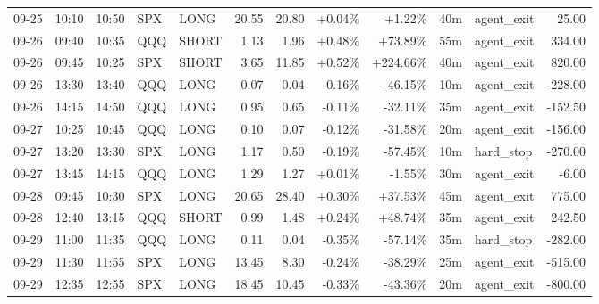 \documentclass[11pt,a4paper,twoside]{article}
\begin{document}
\begin{center}
\begin{longtable}{>{\color{txtmain}}l l l l l r r r r r >{\color{txtmain}}l r}
09-25 & 10:10 & 10:50 & SPX & LONG & 20.55 & 20.80 & \textcolor{wingreen}{+0.04\%} & \textcolor{wingreen}{+1.22\%} & 40m & agent\_exit & \textcolor{wingreen}{25.00} \\
09-26 & 09:40 & 10:35 & QQQ & SHORT & 1.13 & 1.96 & \textcolor{wingreen}{+0.48\%} & \textcolor{wingreen}{+73.89\%} & 55m & agent\_exit & \textcolor{wingreen}{334.00} \\
09-26 & 09:45 & 10:25 & SPX & SHORT & 3.65 & 11.85 & \textcolor{wingreen}{+0.52\%} & \textcolor{wingreen}{+224.66\%} & 40m & agent\_exit & \textcolor{wingreen}{820.00} \\
09-26 & 13:30 & 13:40 & QQQ & LONG & 0.07 & 0.04 & \textcolor{lossred}{-0.16\%} & \textcolor{lossred}{-46.15\%} & 10m & agent\_exit & \textcolor{lossred}{-228.00} \\
09-26 & 14:15 & 14:50 & QQQ & LONG & 0.95 & 0.65 & \textcolor{lossred}{-0.11\%} & \textcolor{lossred}{-32.11\%} & 35m & agent\_exit & \textcolor{lossred}{-152.50} \\
09-27 & 10:25 & 10:45 & QQQ & LONG & 0.10 & 0.07 & \textcolor{lossred}{-0.12\%} & \textcolor{lossred}{-31.58\%} & 20m & agent\_exit & \textcolor{lossred}{-156.00} \\
09-27 & 13:20 & 13:30 & SPX & LONG & 1.17 & 0.50 & \textcolor{lossred}{-0.19\%} & \textcolor{lossred}{-57.45\%} & 10m & hard\_stop & \textcolor{lossred}{-270.00} \\
09-27 & 13:45 & 14:15 & QQQ & LONG & 1.29 & 1.27 & \textcolor{wingreen}{+0.01\%} & \textcolor{lossred}{-1.55\%} & 30m & agent\_exit & \textcolor{lossred}{-6.00} \\
09-28 & 09:45 & 10:30 & SPX & LONG & 20.65 & 28.40 & \textcolor{wingreen}{+0.30\%} & \textcolor{wingreen}{+37.53\%} & 45m & agent\_exit & \textcolor{wingreen}{775.00} \\
09-28 & 12:40 & 13:15 & QQQ & SHORT & 0.99 & 1.48 & \textcolor{wingreen}{+0.24\%} & \textcolor{wingreen}{+48.74\%} & 35m & agent\_exit & \textcolor{wingreen}{242.50} \\
09-29 & 11:00 & 11:35 & QQQ & LONG & 0.11 & 0.04 & \textcolor{lossred}{-0.35\%} & \textcolor{lossred}{-57.14\%} & 35m & hard\_stop & \textcolor{lossred}{-282.00} \\
09-29 & 11:30 & 11:55 & SPX & LONG & 13.45 & 8.30 & \textcolor{lossred}{-0.24\%} & \textcolor{lossred}{-38.29\%} & 25m & agent\_exit & \textcolor{lossred}{-515.00} \\
09-29 & 12:35 & 12:55 & SPX & LONG & 18.45 & 10.45 & \textcolor{lossred}{-0.33\%} & \textcolor{lossred}{-43.36\%} & 20m & agent\_exit & \textcolor{lossred}{-800.00} \\

\end{longtable}
\end{center}
\end{document}

